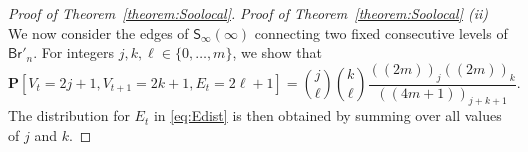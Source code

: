 \documentclass[a4paper,11pt,reqno]{amsart}
\newcommand{\bP}{\mathbf{P}}
\newcommand{\Br}{\mathsf{Br}}
\newcommand{\Soo}{\mathsf{S}_\infty}
\newcommand{\fdf}[1]{(\!(#1)\!)}
\theoremstyle{definition}
\begin{document}
\begin{proof}[Proof of Theorem~\ref{theorem:Soolocal}]
% 
 
 
 \emph{Proof of Theorem~\ref{theorem:Soolocal} (ii)}
We now consider the edges of $\Soo(\infty)$ connecting two fixed consecutive levels of $\Br'_n$. For integers $j,k,\ell\in\{0,\dots,m\}$, we show that 
 \begin{equation}\label{eq:Soolocalproof}
  \bP[V_t=2j+1, V_{t+1}=2k+1, E_t=2\ell+1] = \binom{j}{\ell}\binom{k}{\ell}\frac{\fdf{2m}_j \fdf{2m}_k}{\fdf{4m+1}_{j+k+1}}. 
 \end{equation}
 The distribution for $E_t$ in \eqref{eq:Edist} is then obtained by summing over all values of $j$ and $k$.
 

\end{proof}
\end{document}
